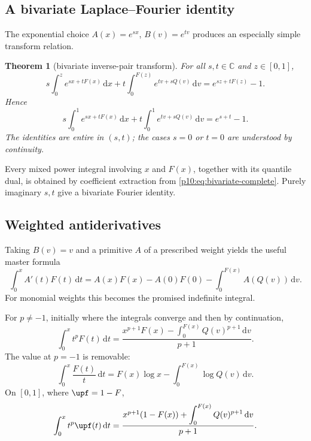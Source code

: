 \documentclass[11pt,oneside]{article}
\newtheorem{theorem}{Theorem}[section]
\theoremstyle{definition}
\theoremstyle{remark}
\newcommand{\F}{F}
\newcommand{\Q}{Q}
\newcommand{\C}{\mathbb C}
\newcommand{\dd}{\,\mathrm d}
\newcommand{\1}{\mathbf 1}
\begin{document}
\subsection{A bivariate Laplace--Fourier identity}

The exponential choice \(A(x)=e^{sx}\), \(B(v)=e^{tv}\) produces an especially
simple transform relation.

\begin{theorem}[bivariate inverse-pair transform]\label{p10:thm:bivariate-exp}
For all \(s,t\in\C\) and \(z\in[0,1]\),
\begin{equation}\label{p10:eq:bivariate-incomplete}
 s\int_0^z e^{sx+t\F(x)}\dd x
 +t\int_0^{\F(z)}e^{tv+s\Q(v)}\dd v
 =e^{sz+t\F(z)}-1.
\end{equation}
Hence
\begin{equation}\label{p10:eq:bivariate-complete}
 s\int_0^1e^{sx+t\F(x)}\dd x
 +t\int_0^1e^{tv+s\Q(v)}\dd v
 =e^{s+t}-1.
\end{equation}
The identities are entire in \((s,t)\); the cases \(s=0\) or \(t=0\) are understood
by continuity.
\end{theorem}

Every mixed power integral involving \(x\) and \(\F(x)\), together with its quantile
dual, is obtained by coefficient extraction from \cref{p10:eq:bivariate-complete}.  Purely
imaginary \(s,t\) give a bivariate Fourier identity.

\subsection{Weighted antiderivatives}

Taking \(B(v)=v\) and a primitive \(A\) of a prescribed weight yields the useful
master formula
\begin{equation}\label{p10:eq:weighted-antiderivative-master}
 \int_0^x A'(t)\F(t)\dd t
 =A(x)\F(x)-A(0)\F(0)-\int_0^{\F(x)}A(\Q(v))\dd v.
\end{equation}
For monomial weights this becomes the promised indefinite integral.

\begin{corollary}\label{p10:cor:monomial-F}
For \(p\ne-1\), initially where the integrals converge and then by continuation,
\begin{equation}\label{p10:eq:monomial-F-antiderivative}
 \int_0^x t^p\F(t)\dd t
 =\frac{x^{p+1}\F(x)-\displaystyle\int_0^{\F(x)}\Q(v)^{p+1}\dd v}{p+1}.
\end{equation}
The value at \(p=-1\) is removable:
\begin{equation}\label{p10:eq:F-over-x-incomplete}
 \int_0^x\frac{\F(t)}t\dd t
 =\F(x)\log x-\int_0^{\F(x)}\log\Q(v)\dd v.
\end{equation}
On \([0,1]\), where \(\upf=1-\F\),
\begin{equation}\label{p10:eq:monomial-up-half-antiderivative}
 \int_0^x t^p\upf(t)\dd t
 =\frac{x^{p+1}(1-\F(x))+\displaystyle\int_0^{\F(x)}\Q(v)^{p+1}\dd v}{p+1}.
\end{equation}
\end{corollary}
\end{document}
